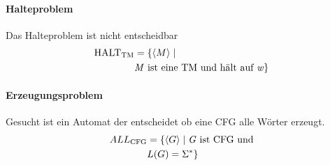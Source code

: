 \paragraph{Halteproblem} Das Halteproblem ist nicht entscheidbar
\begin{align*}
    \text{HALT}_{\text{TM}} &= \{ \langle M \rangle \mid \\
    &\text{\textit{M} ist eine TM und hält auf \textit{w}}\}
\end{align*}
\paragraph{Erzeugungsproblem} Gesucht ist ein Automat der entscheidet ob eine CFG alle Wörter erzeugt.
\begin{align*}
    ALL_{\text{CFG}} &= \{ \langle G \rangle \mid \text{\textit{G} ist CFG und} \\
    &L(G) = \Sigma^* \}
\end{align*}
